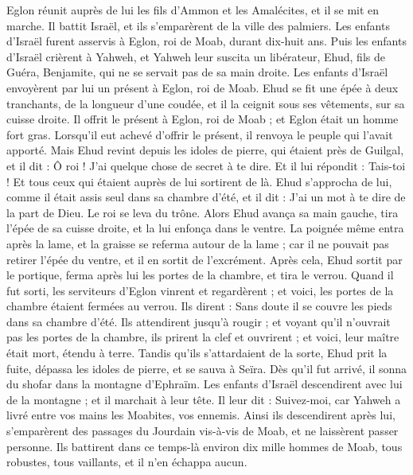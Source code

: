 \begin{multicols}{2}
Eglon réunit auprès de lui les fils d'Ammon et les Amalécites, et il se mit en marche. Il battit Israël, et ils s'emparèrent de la ville des palmiers.
Les enfants d'Israël furent asservis à Eglon, roi de Moab, durant dix-huit ans.
Puis les enfants d'Israël crièrent à Yahweh, et Yahweh leur suscita un libérateur, Ehud, fils de Guéra, Benjamite, qui ne se servait pas de sa main droite. Les enfants d'Israël envoyèrent par lui un présent à Eglon, roi de Moab.
Ehud se fit une épée à deux tranchants, de la longueur d'une coudée, et il la ceignit sous ses vêtements, sur sa cuisse droite.
Il offrit le présent à Eglon, roi de Moab ; et Eglon était un homme fort gras.
Lorsqu’il eut achevé d’offrir le présent, il renvoya le peuple qui l’avait apporté.
Mais Ehud revint depuis les idoles de pierre, qui étaient près de Guilgal, et il dit : Ô roi ! J’ai quelque chose de secret à te dire. Et il lui répondit : Tais-toi ! Et tous ceux qui étaient auprès de lui sortirent de là.
Ehud s'approcha de lui, comme il était assis seul dans sa chambre d'été, et il dit : J'ai un mot à te dire de la part de Dieu. Le roi se leva du trône.
Alors Ehud avança sa main gauche, tira l'épée de sa cuisse droite, et la lui enfonça dans le ventre.
La poignée même entra après la lame, et la graisse se referma autour de la lame ; car il ne pouvait pas retirer l'épée du ventre, et il en sortit de l’excrément.
Après cela, Ehud sortit par le portique, ferma après lui les portes de la chambre, et tira le verrou.
Quand il fut sorti, les serviteurs d'Eglon vinrent et regardèrent ; et voici, les portes de la chambre étaient fermées au verrou. Ils dirent : Sans doute il se couvre les pieds dans sa chambre d’été.
Ils attendirent jusqu’à rougir ; et voyant qu'il n'ouvrait pas les portes de la chambre, ils prirent la clef et ouvrirent ; et voici, leur maître était mort, étendu à terre.
Tandis qu’ils s’attardaient de la sorte, Ehud prit la fuite, dépassa les idoles de pierre, et se sauva à Seïra.
Dès qu’il fut arrivé, il sonna du shofar dans la montagne d'Ephraïm. Les enfants d'Israël descendirent avec lui de la montagne ; et il marchait à leur tête.
Il leur dit : Suivez-moi, car Yahweh a livré entre vos mains les Moabites, vos ennemis. Ainsi ils descendirent après lui, s’emparèrent des passages du Jourdain vis-à-vis de Moab, et ne laissèrent passer personne.
Ils battirent dans ce temps-là environ dix mille hommes de Moab, tous robustes, tous vaillants, et il n'en échappa aucun.

\end{multicols}
